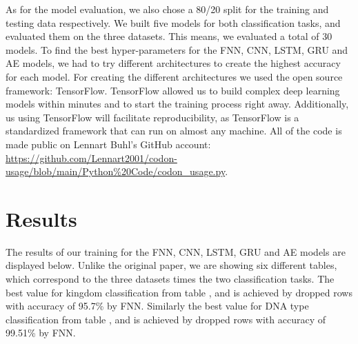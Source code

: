 \documentclass[conference]{IEEEtran}
\newcommand{\rom}[1]{\uppercase\expandafter{\romannumeral #1\relax}}
\begin{document}
As for the model evaluation, we also chose a 80/20 split for the training and testing data respectively. We built five models for both classification tasks, and evaluated them on the three datasets. This means, we evaluated a total of 30 models. To find the best hyper-parameters for the FNN, CNN, LSTM, GRU and AE models, we had to try different architectures to create the highest accuracy for each model. 
For creating the different architectures we used the open source framework: TensorFlow. TensorFlow allowed us to build complex deep learning models within minutes and to start the training process right away. Additionally, us using TensorFlow will facilitate reproducibility, as TensorFlow is a standardized framework that can run on almost any machine. All of the code is made public on Lennart Buhl’s GitHub account: \url{https://github.com/Lennart2001/codon-usage/blob/main/Python\%20Code/codon\_usage.py}.


\section{Results}
The results of our training for the FNN, CNN, LSTM, GRU and AE models are displayed below. Unlike the original paper, we are showing six different tables, which correspond to the three datasets times the two classification tasks. The best value for kingdom classification from table \rom{1},\rom{2} and \rom{3} is achieved by dropped rows with accuracy of 95.7\% by FNN. Similarly the best value for DNA type classification from table \rom{4}, \rom{5} and \rom{6} is achieved by dropped rows with accuracy of 99.51\% by FNN. 
\end{document}
